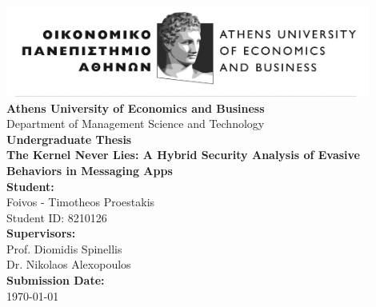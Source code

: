 \documentclass[a4paper,12pt]{report}
\begin{document}
\begin{titlepage}
    \begin{center}
        \vspace*{1.5cm}

        \includegraphics[width=0.9\textwidth]{./aueb_logo.png}\\[1cm]

        {\Large \textbf{Athens University of Economics and Business}}\\[0.5cm]
        {\large Department of Management Science and Technology}\\[1.5cm]

        {\Huge \textbf{Undergraduate Thesis}}\\[1.2cm]
        {\Large \textbf{The Kernel Never Lies: A Hybrid Security Analysis of Evasive Behaviors in Messaging Apps}}\\[2cm]
        \textbf{Student:}\\
        Foivos - Timotheos Proestakis\\
        Student ID: 8210126\\[1.5cm]

        \textbf{Supervisors:}\\
        Prof. Diomidis Spinellis \\
        Dr. Nikolaos Alexopoulos\\[1.5cm]

        \vfill
        \textbf{Submission Date:}\\
        \today
        \vspace*{1cm}
    \end{center}
\end{titlepage}
\clearpage
\end{document}
